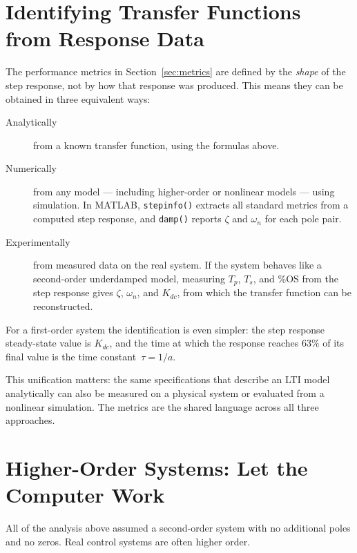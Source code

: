 \documentclass[12pt]{article}
\begin{document}
\section{Identifying Transfer Functions from Response Data}
\label{sec:testing}

The performance metrics in Section~\ref{sec:metrics} are defined by the
\emph{shape} of the step response, not by how that response was produced.
This means they can be obtained in three equivalent ways:

\begin{description}
  \item[Analytically] from a known transfer function, using the formulas above.
  \item[Numerically] from any model --- including higher-order or nonlinear
    models --- using simulation.  In MATLAB, \texttt{stepinfo()} extracts all
    standard metrics from a computed step response, and \texttt{damp()} reports
    $\zeta$ and $\omega_n$ for each pole pair.
  \item[Experimentally] from measured data on the real system.  If the system
    behaves like a second-order underdamped model, measuring $T_p$, $T_s$, and
    \%OS from the step response gives $\zeta$, $\omega_n$, and $K_{dc}$, from
    which the transfer function can be reconstructed.
\end{description}

For a first-order system the identification is even simpler: the step response
steady-state value is $K_{dc}$, and the time at which the response reaches
$63\%$ of its final value is the time constant~$\tau = 1/a$.

This unification matters: the same specifications that describe an LTI model
analytically can also be measured on a physical system or evaluated from a
nonlinear simulation.  The metrics are the shared language across all three
approaches.

\section{Higher-Order Systems: Let the Computer Work}
\label{sec:higher}

All of the analysis above assumed a second-order system with no additional
poles and no zeros.  Real control systems are often higher order.
\end{document}
